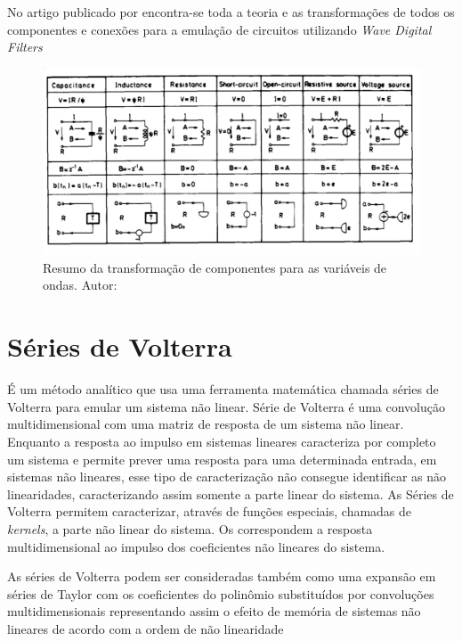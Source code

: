 No artigo publicado por \cite{fettweis1986wave} encontra-se toda a teoria e as transformações de todos os componentes e conexões para a emulação de circuitos utilizando \textit{Wave Digital Filters}

\begin{figure}[!htb]
	\centering
	\includegraphics[width=1\linewidth]{figuras/ComponentesemWDF}
	\caption{Resumo da transformação de componentes para as variáveis de ondas. Autor:\cite{fettweis1986wave}}
	\label{fig:componentesemwdf}
\end{figure}




\section*{Séries de Volterra}{\label{Volterra}}
É um método analítico que usa uma ferramenta matemática chamada séries de Volterra para emular um sistema não linear. Série de Volterra é uma convolução multidimensional com uma matriz de resposta de um sistema não linear. Enquanto a resposta ao impulso em sistemas lineares caracteriza por completo um sistema e permite prever uma resposta para uma determinada entrada, em sistemas não lineares, esse tipo de caracterização não consegue identificar as não linearidades, caracterizando assim somente a parte linear do sistema. As Séries de Volterra permitem caracterizar, através de funções especiais, chamadas de \textit{kernels}, a parte não linear do sistema. Os  correspondem a resposta multidimensional ao impulso dos coeficientes não lineares do sistema. \cite{pakarinen2009review}

As séries de Volterra podem ser consideradas também como uma expansão em séries de Taylor com os coeficientes do polinômio substituídos por convoluções multidimensionais representando assim o efeito de memória de sistemas não lineares de acordo com a ordem de não linearidade \cite{pakarinen2009review}



